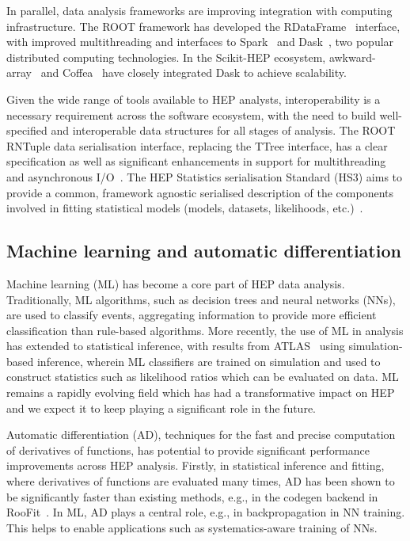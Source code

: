 \documentclass[10pt,a4paper]{article}
\begin{document}
In parallel, data analysis frameworks are improving integration with
computing infrastructure. The ROOT framework has developed the
RDataFrame~\cite{10.1051/epjconf/201921406029} interface, with improved
multithreading and interfaces to Spark~\cite{https://doi.org/10.1145/2934664}
and Dask~\cite{doi:10.25080/Majora-7b98e3ed-013}, two popular distributed
computing technologies. In the Scikit-HEP ecosystem, awkward-array~\cite{2001.06307}
and Coffea~\cite{2008.12712} have closely integrated
Dask to achieve scalability.

Given the wide range of tools available to HEP analysts,
interoperability is a necessary requirement across the software
ecosystem, with the need to build well-specified and interoperable data
structures for all stages of analysis. The ROOT RNTuple data
serialisation interface, replacing the TTree interface, has a clear
specification as well as significant enhancements in support for
multithreading and asynchronous I/O~\cite{https://doi.org/10.1051/epjconf/202429506020}.
The HEP Statistics serialisation Standard (HS3) aims to provide a
common, framework agnostic serialised description of the components
involved in fitting statistical models (models, datasets, likelihoods,
etc.)~\cite{https://github.com/hep-statistics-serialization-standard/hep-statistics-serialization-standard}.

\subsection{Machine learning and automatic
differentiation}\label{machine-learning-and-automatic-differentiation}

Machine learning (ML) has become a core part of HEP data analysis.
Traditionally, ML algorithms, such as decision trees and neural networks
(NNs), are used to classify events, aggregating information to provide
more efficient classification than rule-based algorithms. More recently,
the use of ML in analysis has extended to statistical inference, with
results from ATLAS~\cite{https://arxiv.org/pdf/2412.01548,https://arxiv.org/pdf/2412.01600}
using simulation-based inference, wherein ML classifiers are trained on
simulation and used to construct statistics such as likelihood ratios
which can be evaluated on data. ML remains a rapidly evolving field
which has had a transformative impact on HEP and we expect it to keep
playing a significant role in the future.

Automatic differentiation (AD), techniques for the fast and precise
computation of derivatives of functions, has potential to provide
significant performance improvements across HEP analysis. Firstly, in
statistical inference and fitting, where derivatives of functions are
evaluated many times, AD has been shown to be significantly faster than
existing methods, e.g., in the codegen backend in
RooFit~\cite{Hageboeck:2020dyv}. In ML, AD
plays a central role, e.g., in backpropagation in NN training. This
helps to enable applications such as systematics-aware training of NNs.
\end{document}
